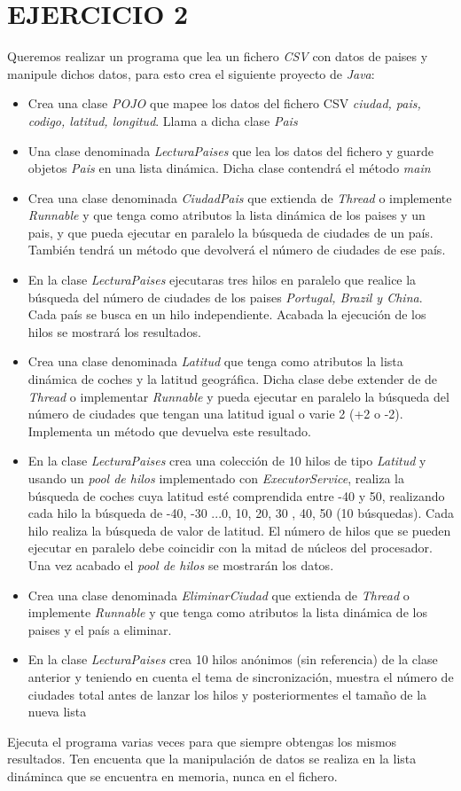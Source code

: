 \documentclass[addpoints]{exam}
\begin{document}
\section{EJERCICIO 2}
Queremos realizar un programa que lea un fichero \emph{CSV} con datos de paises y manipule dichos datos, para esto crea el siguiente proyecto de \emph{Java}:
\begin{itemize}
\item Crea una clase \emph{POJO} que mapee los datos del fichero CSV \emph{ciudad, pais, codigo, latitud, longitud}. Llama a dicha clase \emph{Pais}
\item Una clase denominada \emph{LecturaPaises} que lea los datos del fichero y guarde objetos \emph{Pais} en una lista dinámica. Dicha clase contendrá el método \emph{main}
\item Crea una clase denominada \emph{CiudadPais} que extienda de \emph{Thread} o implemente \emph{Runnable} y que tenga como atributos la lista dinámica de los paises y un pais, y que pueda ejecutar en paralelo la búsqueda de ciudades de un país. También tendrá un método que devolverá el número de ciudades de ese país.
\item En la clase \emph{LecturaPaises} ejecutaras tres hilos en paralelo que realice la búsqueda del número de ciudades de los paises \emph{Portugal, Brazil y China}. Cada país se busca en un hilo independiente. Acabada la ejecución de los hilos se mostrará los resultados.
\item Crea una clase denominada \emph{Latitud} que tenga como atributos la lista dinámica de coches y la latitud geográfica. Dicha clase debe extender de de \emph{Thread} o implementar \emph{Runnable} y pueda ejecutar en paralelo la búsqueda del  número de ciudades que tengan una latitud igual o varie 2 (+2 o -2). Implementa un método que devuelva este resultado.
\item En la clase \emph{LecturaPaises} crea una colección de 10 hilos de tipo \emph{Latitud} y usando un \emph{pool de hilos} implementado con \emph{ExecutorService}, realiza la búsqueda de coches cuya latitud esté comprendida entre -40 y 50, realizando cada hilo la búsqueda de -40, -30 ...0, 10, 20, 30 , 40, 50 (10 búsquedas). Cada hilo realiza la búsqueda de valor de latitud. El número de hilos que se pueden ejecutar en paralelo debe coincidir con la mitad de núcleos del procesador. Una vez acabado el \emph{pool de hilos} se mostrarán los datos.
\item Crea una clase denominada \emph{EliminarCiudad}  que extienda de \emph{Thread} o implemente \emph{Runnable} y que tenga como atributos la lista dinámica de los paises y el país a eliminar.
\item En la clase \emph{LecturaPaises} crea 10 hilos anónimos (sin referencia) de la clase anterior y teniendo en cuenta el tema de sincronización, muestra el número de ciudades total antes de lanzar los hilos y posteriormentes el tamaño de la nueva lista
\end{itemize}
Ejecuta el programa varias veces para que siempre obtengas los mismos resultados. Ten encuenta que la manipulación de datos se realiza en la lista dináminca que se encuentra en memoria, nunca en el fichero.
\end{document}
